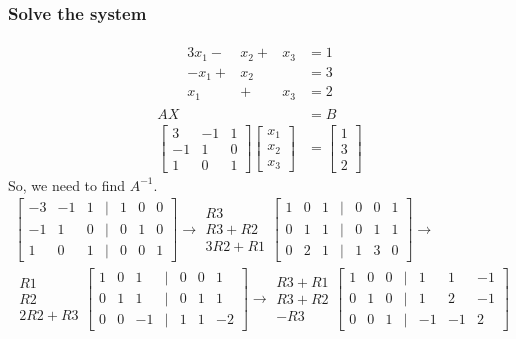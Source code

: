 \documentclass[14pt]{extarticle}
\begin{document}
\subsubsection{Solve the system}
\begin{align*}
	\begin{array}{cccc}
		3x_1 - & x_2 + & x_3 & = 1 \\
		-x_1 + & x_2 & & =3 \\
		x_1  & + & x_3 & =2
	\end{array} 
\end{align*}
\begin{align*}
	AX&=B \\
	\begin{bmatrix}
		3 & -1 & 1 \\
		-1 & 1 & 0 \\
		1 & 0 & 1
	\end{bmatrix}
	\begin{bmatrix}	x_1 \\	x_2 \\	x_3	\end{bmatrix}
	&= \begin{bmatrix}	1 \\3 \\2\end{bmatrix}
\end{align*}
So, we need to find $A^{-1}$.
\begin{align*}
	\begin{bmatrix}
		-3 & -1 & 1 & | & 1 & 0 & 0 \\
		-1 & 1 & 0 & | & 0 & 1 & 0 \\
		1 & 0 & 1 & | & 0 & 0 & 1
	\end{bmatrix} \to
	\begin{array}{r}
		R3 \\
		R3+R2 \\
		3R2 + R1
	\end{array}
	\begin{bmatrix}
		1 & 0 & 1 & | & 0 & 0 & 1 \\
		0 & 1 & 1 & | & 0 & 1 & 1 \\
		0 & 2 & 1 & | & 1 & 3 & 0
	\end{bmatrix} \to \\
	\begin{array}{r}
		R1 \\
		R2 \\
		2R2 + R3
	\end{array}
	\begin{bmatrix}
		1 & 0 & 1 & | & 0 & 0 & 1 \\
		0 & 1 & 1 & | & 0 & 1 & 1 \\
		0 & 0 & -1 & | & 1 & 1 & -2
	\end{bmatrix} \to
	\begin{array}{r}
		R3+R1 \\
		R3+R2 \\
		-R3
	\end{array}
	\begin{bmatrix}
		1 & 0 & 0 & | & 1 & 1 & -1 \\
		0 & 1 & 0 & | & 1 & 2 & -1 \\
		0 & 0 & 1 & | & -1 & -1 & 2
	\end{bmatrix}
\end{align*}
\end{document}
